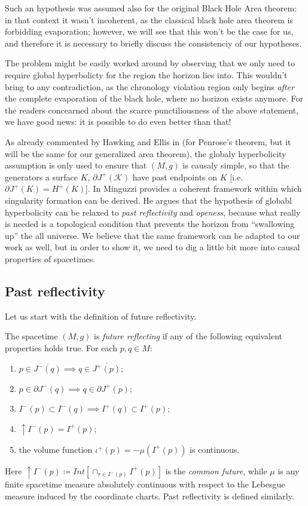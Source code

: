 Such an hypothesis was assumed also for the original Black Hole Area theorem: in that context it wasn't incoherent, as the classical black hole area theorem is forbidding evaporation; however, we will see that this won't be the case for us, and therefore it is necessary to briefly discuss the consistenciy of our hypotheses.

The problem might be easily worked around by observing that we only need to require global hyperbolicty for the region the horizon lies into. This wouldn't bring to any contradiction, as the chronology violation region only begins \emph{after} the complete evaporation of the black hole, where no horizon exists anymore. For the readers concearned about the scarce punctiliousness of the above statement, we have good news: it is possible to do even better than that! 

As already commented by Hawking and Ellis in \cite[]{hawking1973large} (for Penrose's theorem, but it will be the same for our generalized area theorem), the globaly hyperbolicity assumption is only used to ensure that \((M, g)\) is causaly simple, so that the generators a surface \(K\), \(\partial J^+(\mathscr{K})\) have past endpoints on \(K\) [i.e. \(\partial J^+(K) = H^+(K)\)].
In \cite{minguzzi2020gravitational} Minguzzi provides a coherent framework within which singularity formation can be derived. He argues that the hypothesis of globabl hyperbolicity can be relaxed to \emph{past reflectivity} and \emph{openess}, because what really is needed is a topological condition that prevents the horizon from ``swallowing up'' the all universe. We believe that the same framework can be adapted to our work as well, but in order to show it, we need to dig a little bit more into causal properties of spacetimes.

\subsection{Past reflectivity}
	\label{subsec:past-reflectivity}
	Let us start with the definition of future reflectivity.
	\begin{definition}
		The spacetime \((M,g)\) is \emph{future reflecting} if any of the following equivalent properties holds true. For each \(p, q\in M\):
		\begin{enumerate}
			\item \(p\in \overline{ J^-(q)} \implies q\in \overline{J^+(p)}\);
			\item  \(p\in \partial J^-(q) \implies q\in \partial J^+(p)\);
			\item \(I^-(p) \subset I^-(q) \implies I^+(q) \subset I^+(p)\);
			\item \(\uparrow I^-(p) = I^+(p)\);
			\item the volume function \(\iota^+(p) = - \mu(I^+(p))\) is continuous.
		\end{enumerate}
	\end{definition}
	Here \(\uparrow I^-(p) \coloneqq Int\left[\cap_{r\in I^-(p)}I^+(p)\right]\) is the \emph{common future}, while \(\mu\) is any finite spacetime measure absolutely continuous with respect to the Lebesgue measure induced by the coordinate charts. Past reflectivity is defined similarly.

